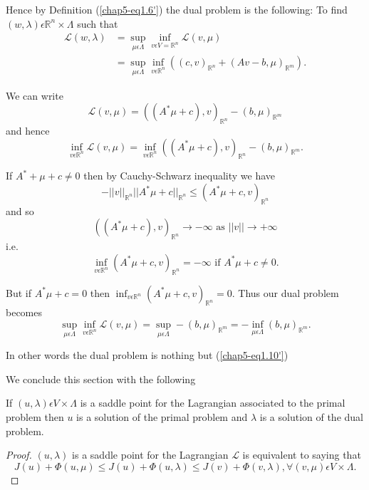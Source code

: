 Hence by Definition (\ref{chap5-eq1.6'}) the dual problem is the following: To find $(w, \lambda) \epsilon \mathbb{R}^{n} \times \Lambda$ such that
\begin{align*}
\mathscr{L} (w, \lambda) & = \sup_{\mu \epsilon \Lambda} \inf_{v \epsilon V = \mathbb{R}^{n}} \mathscr{L}(v, \mu)\\
& = \sup_{\mu \epsilon \Lambda} \inf_{v \epsilon \mathbb{R}^{n}} ((c, v)_{\mathbb{R}^{n}} + (Av-b, \mu)_{\mathbb{R}^{m}}).
\end{align*}

We can write
$$
\mathscr{L}(v, \mu) = ((A^{*} \mu + c), v)_{\mathbb{R}^{n}} - (b, \mu)_{\mathbb{R}^{m}}
$$
and hence
$$
\inf_{v \epsilon \mathbb{R}^{n}} \mathscr{L} (v, \mu) = \inf_{v \epsilon \mathbb{R}^{n}} ((A^{*} \mu + c), v)_{\mathbb{R}^{n}} - (b, \mu)_{\mathbb{R}^{m}}.
$$

If $A^{*} + \mu + c \neq 0$ then by Cauchy-Schwarz inequality we have
$$
-||v||_{\mathbb{R}^{n}} ||A^{*} \mu + c ||_{\mathbb{R}^{n}} \leq (A^{*} \mu + c, v)_{\mathbb{R}^{n}} 
$$
and so
$$
((A^{*} \mu + c), v)_{\mathbb{R}^{n}} \to - \infty \text{ as } ||v|| \to + \infty 
$$
i.e.
$$
\inf_{v \epsilon \mathbb{R}^{n}} (A^{*} \mu + c, v)_{\mathbb{R}^{n}} = -\infty \text{ if } A^{*} \mu + c \neq 0.
$$

But if $A^{*} \mu + c = 0$ then $\inf_{v \epsilon \mathbb{R}^{n}} (A^{*} \mu + c, v)_{\mathbb{R}^{n}} = 0$. Thus our dual problem becomes
$$
\sup_{\mu \epsilon \Lambda} \inf_{v \epsilon \mathbb{R}^{n}} \mathscr{L}(v, \mu) = \sup_{\mu \epsilon \Lambda} - (b, \mu)_{\mathbb{R}^{m}} = -\inf_{\mu \epsilon \Lambda} (b, \mu)_{\mathbb{R}^{m}}.
$$

In other words the dual problem is nothing but (\ref{chap5-eq1.10'})

We conclude this section with the following

\begin{proposition}\label{chap5-prop1.4}
If $(u, \lambda) \epsilon V \times \Lambda$ is a saddle point for the Lagrangian associated to the primal problem then $u$ is a solution of the primal problem and $\lambda$ is a solution of the dual problem.
\end{proposition}

\begin{proof}
$(u, \lambda)$ is a saddle point for the Lagrangian $\mathscr{L}$ is equivalent to saying that 
\begin{equation*}
J(u) + \Phi(u, \mu) \leq J(u) + \Phi (u, \lambda) \leq J(v) +\Phi(v, \lambda), \forall (v, \mu) \epsilon V \times \Lambda.\tag{1.11}\label{chap5-eq1.11}
\end{equation*}
\end{proof}\pageoriginale


